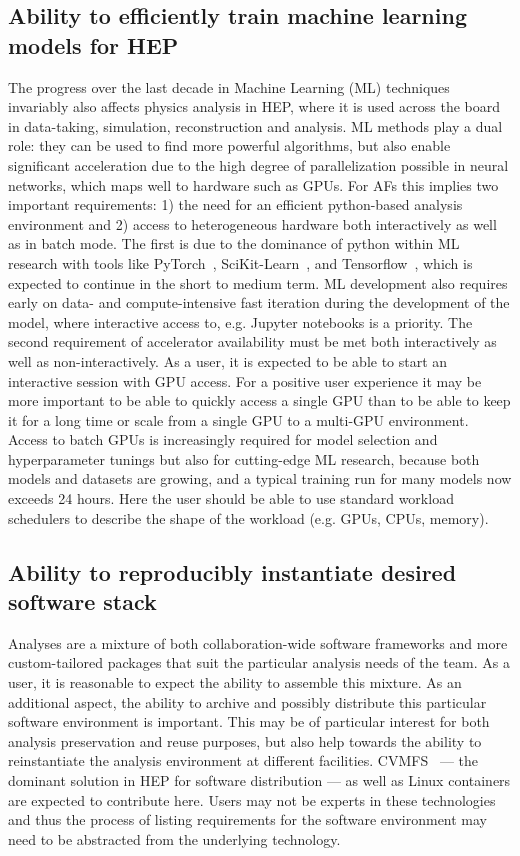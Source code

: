 \subsection*{Ability to efficiently train machine learning models for HEP}

The progress over the last decade in Machine Learning (ML) techniques invariably also affects physics analysis in HEP, where it is used across the board in data-taking, simulation, reconstruction and analysis. ML methods play a dual role: they can be used to find more powerful algorithms, but also enable significant acceleration due to the high degree of parallelization possible in neural networks, which maps well to hardware such as GPUs. For AFs this implies two important requirements: 1) the need for an efficient python-based analysis environment and 2) access to heterogeneous hardware both interactively as well as in batch mode. The first is due to the dominance of python within ML research with tools like PyTorch~\cite{pytorch}, SciKit-Learn~\cite{scikit-learn}, and Tensorflow~\cite{tensorflow}, which is expected to continue in the short to medium term. ML development also requires early on data- and compute-intensive fast iteration during the development of the model, where interactive access to, e.g. Jupyter notebooks is a priority. The second requirement of accelerator availability must be met both interactively as well as non-interactively. As a user, it is expected to be able to start an interactive session with GPU access. For a positive user experience it may be more important to be able to quickly access a single GPU than to be able to keep it for a long time or scale from a single GPU to a multi-GPU environment. Access to batch GPUs is increasingly required for model selection and hyperparameter tunings but also for cutting-edge ML research, because both models and datasets are growing, and a typical training run for many models now exceeds 24 hours. Here the user should be able to use standard workload schedulers to describe the shape of the workload (e.g. GPUs, CPUs, memory). 

\subsection*{Ability to reproducibly instantiate desired software stack}

Analyses are a mixture of both collaboration-wide software frameworks and more custom-tailored packages that suit the particular analysis needs of the team. As a user, it is reasonable to expect the ability to assemble this mixture. As an additional aspect, the ability to archive and possibly distribute this particular software environment is important. This may be of particular interest for both analysis preservation and reuse purposes, but also help towards the ability to reinstantiate the analysis environment at different facilities. CVMFS~\cite{cvmfs} --- the dominant solution in HEP for software distribution --- as well as Linux containers are expected to contribute here. Users may not be experts in these technologies and thus the process of listing requirements for the software environment may need to be abstracted from the underlying technology.

